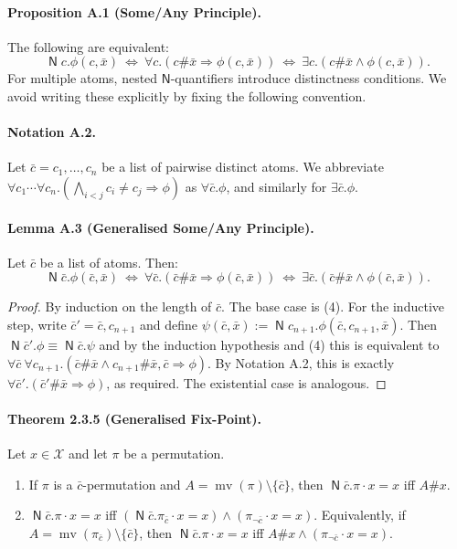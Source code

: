 \documentclass[10pt,a4paper]{amsart}
\newcommand{\newq}{\mathop{\mathsf N}}
\begin{document}
\paragraph{Proposition A.1 (Some/Any Principle).} The following are equivalent:
\[
\newq c.\phi(c,\bar x)\ \Longleftrightarrow\ \forall c.(c\#\bar x\Rightarrow\phi(c,\bar x))\ \Longleftrightarrow\ \exists c.(c\#\bar x\land\phi(c,\bar x)).
\]
For multiple atoms, nested $\mathsf N$-quantifiers introduce distinctness conditions. We avoid writing these explicitly by fixing the following convention.
\paragraph{Notation A.2.} Let $\bar c=c_1,\ldots,c_n$ be a list of pairwise distinct atoms.
We abbreviate $\forall c_1\cdots\forall c_n.(\bigwedge_{i<j}c_i\ne c_j\Rightarrow\phi)$ as $\forall\bar c.\phi$, and similarly for $\exists\bar c.\phi$.
\paragraph{Lemma A.3 (Generalised Some/Any Principle).} Let $\bar c$ be a list of atoms. Then:
\[
\newq\bar c.\phi(\bar c,\bar x)\ \Longleftrightarrow\ \forall\bar c.(\bar c\#\bar x\Rightarrow\phi(\bar c,\bar x))\ \Longleftrightarrow\ \exists\bar c.(\bar c\#\bar x\land\phi(\bar c,\bar x)).
\]
\begin{proof}
By induction on the length of $\bar c$. The base case is (4).
For the inductive step, write $\bar c'=\bar c,c_{n+1}$ and define $\psi(\bar c,\bar x):=\newq c_{n+1}.\phi(\bar c,c_{n+1},\bar x)$.
Then $\newq\bar c'.\phi\equiv\newq\bar c.\psi$ and by the induction hypothesis and (4) this is equivalent to $\forall\bar c\ \forall c_{n+1}.(\bar c\#\bar x\land c_{n+1}\#\bar x,\bar c\Rightarrow\phi)$.
By Notation A.2, this is exactly $\forall\bar c'.(\bar c'\#\bar x\Rightarrow\phi)$, as required. The existential case is analogous.
\end{proof}

\paragraph{Theorem 2.3.5 (Generalised Fix-Point).} Let $x\in\mathcal X$ and let $\pi$ be a permutation.
\begin{enumerate}
\item If $\pi$ is a $\bar c$-permutation and $A=\operatorname{mv}(\pi)\setminus\{\bar c\}$, then $\newq\bar c.\pi\cdot x=x$ iff $A\#x$.
\item $\newq\bar c.\pi\cdot x=x$ iff $(\newq\bar c.\pi_{\bar c}\cdot x=x)\land(\pi_{\neg\bar c}\cdot x=x)$.
Equivalently, if $A=\operatorname{mv}(\pi_{\bar c})\setminus\{\bar c\}$, then $\newq\bar c.\pi\cdot x=x$ iff $A\#x\land(\pi_{\neg\bar c}\cdot x=x)$.
\end{enumerate}
\end{document}
